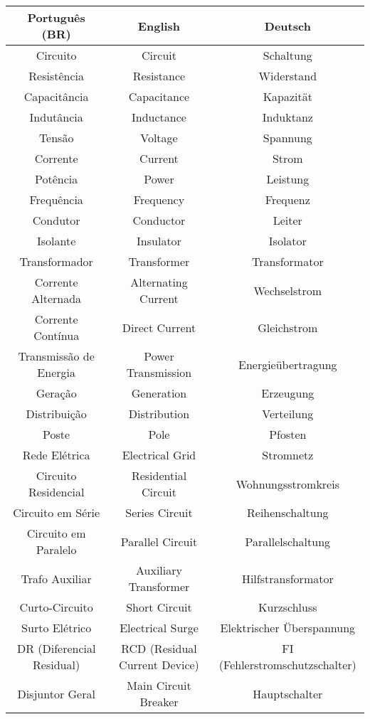 \begin{table}[ht]
  \centering
  \begin{tabular}{|c|c|c|}
  \hline
  \textbf{Português (BR)} & \textbf{English} & \textbf{Deutsch} \\
  \hline
  Circuito & Circuit & Schaltung \\
  Resistência & Resistance & Widerstand \\
  Capacitância & Capacitance & Kapazität \\
  Indutância & Inductance & Induktanz \\
  Tensão & Voltage & Spannung \\
  Corrente & Current & Strom \\
  Potência & Power & Leistung \\
  Frequência & Frequency & Frequenz \\
  Condutor & Conductor & Leiter \\
  Isolante & Insulator & Isolator \\
  Transformador & Transformer & Transformator \\
  Corrente Alternada & Alternating Current & Wechselstrom \\
  Corrente Contínua & Direct Current & Gleichstrom \\
  Transmissão de Energia & Power Transmission & Energieübertragung \\
  Geração & Generation & Erzeugung \\
  Distribuição & Distribution & Verteilung \\
  Poste & Pole & Pfosten \\
  Rede Elétrica & Electrical Grid & Stromnetz \\
  Circuito Residencial & Residential Circuit & Wohnungsstromkreis \\
  Circuito em Série & Series Circuit & Reihenschaltung \\
  Circuito em Paralelo & Parallel Circuit & Parallelschaltung \\
  Trafo Auxiliar & Auxiliary Transformer & Hilfstransformator \\
  Curto-Circuito & Short Circuit & Kurzschluss \\
  Surto Elétrico & Electrical Surge & Elektrischer Überspannung \\
  DR (Diferencial Residual) & RCD (Residual Current Device) & FI (Fehlerstromschutzschalter) \\
  Disjuntor Geral & Main Circuit Breaker & Hauptschalter \\

\end{tabular}
\end{table}
